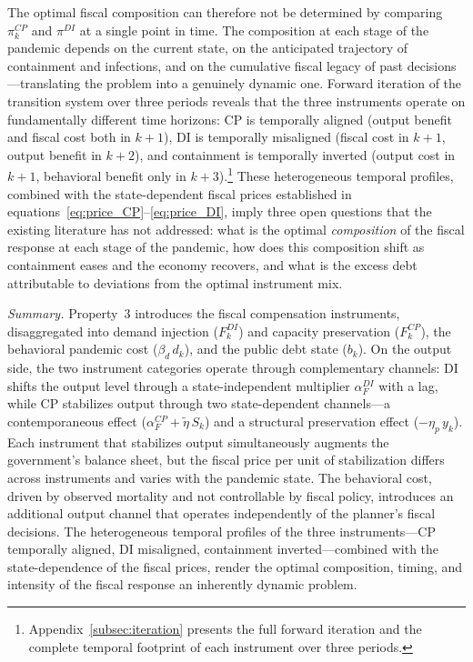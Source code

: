 \documentclass[12pt, a4paper]{article}
\begin{document}
The optimal fiscal composition can therefore not be determined by 
comparing $\pi^{CP}_k$ and $\pi^{DI}$ at a single point in time. 
The composition at each stage of the pandemic depends on the current 
state, on the anticipated trajectory of containment and infections, 
and on the cumulative fiscal legacy of past decisions---translating 
the problem into a genuinely dynamic one. Forward iteration of the 
transition system over three periods reveals that the three instruments operate on fundamentally different time horizons: CP is temporally aligned (output benefit and fiscal cost both in $k+1$), DI is temporally misaligned (fiscal cost in $k+1$, output benefit in $k+2$), and containment is temporally inverted (output cost in $k+1$, behavioral benefit only in $k+3$).\footnote{Appendix~\ref{subsec:iteration} presents the 
full forward iteration and the complete temporal footprint of each 
instrument over three periods.} These heterogeneous temporal 
profiles, combined with the state-dependent fiscal prices established in equations~\eqref{eq:price_CP}--\eqref{eq:price_DI}, imply three open questions that the existing literature has not addressed: what is the optimal \textit{composition} of the fiscal response at each stage of the pandemic, how does this composition shift as containment eases and the economy recovers, and what is the excess debt attributable to deviations from the optimal instrument mix.

\vspace{5mm}
\noindent\textit{Summary.} Property~3 introduces the fiscal compensation instruments, disaggregated into demand injection ($F^{DI}_k$) and capacity preservation ($F^{CP}_k$), the behavioral pandemic cost ($\beta_d\, d_k$), and the public debt state ($b_k$). On the output side, the two instrument categories operate through complementary channels: DI shifts the output level through a state-independent multiplier $\alpha^{DI}_F$ with a lag, while CP stabilizes output through two state-dependent channels---a contemporaneous effect ($\alpha^{CP}_F + \tilde{\eta}\, S_k$) and a structural preservation effect ($-\eta_p\, y_k$). Each instrument that stabilizes output simultaneously augments the government's balance sheet, but the fiscal price per unit of stabilization differs across instruments and varies with the pandemic state. The behavioral cost, driven by observed mortality and not controllable by fiscal policy, introduces an additional 
output channel that operates independently of the planner's fiscal decisions. The heterogeneous temporal profiles of the three instruments---CP temporally aligned, DI misaligned, containment inverted---combined with the state-dependence of the fiscal prices, render the optimal composition, timing, and intensity of the fiscal response an inherently dynamic problem.
\end{document}
